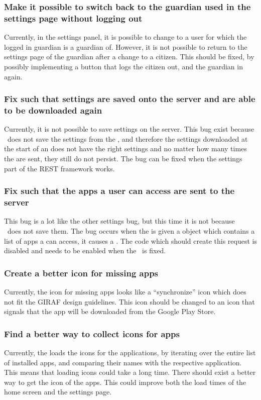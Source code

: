 \subsubsection{Make it possible to switch back to the guardian used in the
settings page without logging out} Currently, in the settings panel, it is
possible to change to a user for which the logged in guardian is a guardian of.
However, it is not possible to return to the settings page of the guardian after
a change to a citizen. This should be fixed, by possibly implementing a button
that logs the citizen out, and the guardian in again.
  
\subsubsection{Fix such that settings are saved onto the server and are able to
be downloaded again} Currently, it is not possible to save settings on the
server. This bug exist because \rlib\ does not save the settings from the
, and therefore the settings downloaded at the start of
an  does not have the right settings and no matter how many times
the are sent, they still do not persist. The bug can be fixed when
the settings part of the REST framework works.

\subsubsection{Fix such that the apps a user can access are sent to the server}
This bug is a lot like the other settings bug, but this time it is not because
\\\rlib\ does not save them. The bug occurs when the  is
given a  object which contains a list of apps a  can
access, it causes a . The code which should create
this request is disabled and needs to be enabled when the \rlib\ is fixed.

\subsubsection{Create a better icon for missing apps}
Currently, the icon for missing apps looks like a ``synchronize'' icon which
does not fit the GIRAF design guidelines. This icon should be changed to an
icon that signals that the app will be downloaded from the Google Play Store.

\subsubsection{Find a better way to collect icons for apps}
Currently, the  loads the icons for the applications, by
iterating over the entire list of installed apps, and comparing their names with
the respective application. This means that loading icons could take a long
time. There should exist a better way to get the icon of the apps. This could
improve both the load times of the home screen and the settings page.

